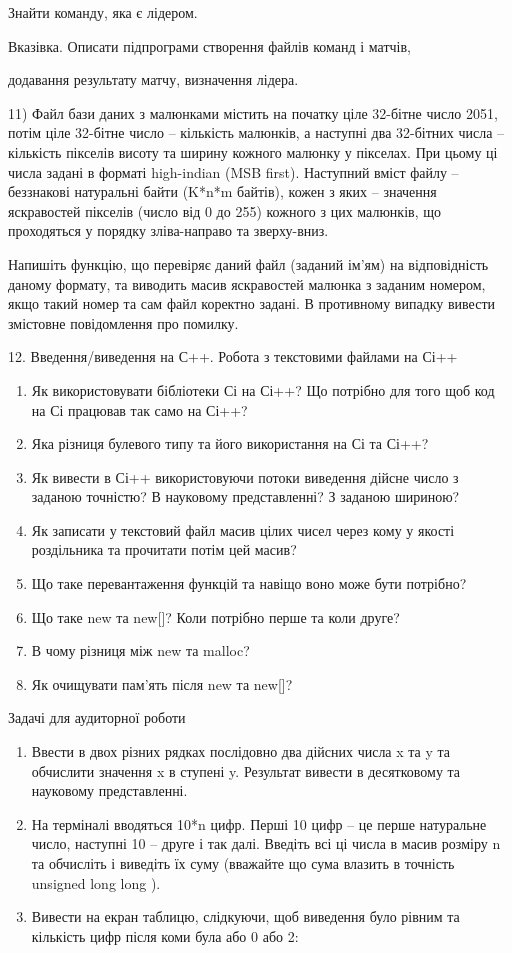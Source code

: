\documentclass[]{article}
\begin{document}
Знайти команду, яка є лідером.

Вказівка. Описати підпрограми створення файлів команд і матчів,

додавання результату матчу, визначення лідера.

11) Файл бази даних з малюнками містить на початку ціле 32-бітне число
2051, потім ціле 32-бітне число -- кількість малюнків, а наступні два
32-бітних числа -- кількість пікселів висоту та ширину кожного малюнку у
пікселах. При цьому ці числа задані в форматі high-indian (MSB first).
Наступний вміст файлу -- беззнакові натуральні байти (K*n*m байтів),
кожен з яких -- значення яскравостей пікселів (число від 0 до 255)
кожного з цих малюнків, що проходяться у порядку зліва-направо та
зверху-вниз.

Напишіть функцію, що перевіряє даний файл (заданий ім'ям) на
відповідність даному формату, та виводить масив яскравостей малюнка з
заданим номером, якщо такий номер та сам файл коректно задані. В
противному випадку вивести змістовне повідомлення про помилку.

12. Введення/виведення на С++. Робота з текстовими файлами на Сі++

\begin{enumerate}
\def\labelenumi{\arabic{enumi})}
\item
  Як використовувати бібліотеки Сі на Сі++? Що потрібно для того щоб код
  на Сі працював так само на Сі++?
\item
  Яка різниця булевого типу та його використання на Сі та Сі++?
\item
  Як вивести в Сі++ використовуючи потоки виведення дійсне число з
  заданою точністю? В науковому представленні? З заданою шириною?
\item
  Як записати у текстовий файл масив цілих чисел через кому у якості
  роздільника та прочитати потім цей масив?
\item
  Що таке перевантаження функцій та навіщо воно може бути потрібно?
\item
  Що таке new та new{[}{]}? Коли потрібно перше та коли друге?
\item
  В чому різниця між new та malloc?
\item
  Як очищувати пам'ять після new та new{[}{]}?
\end{enumerate}

Задачі для аудиторної роботи

\begin{enumerate}
\def\labelenumi{\arabic{enumi})}
\item
  Ввести в двох різних рядках послідовно два дійсних числа x та y та
  обчислити значення x в ступені y. Результат вивести в десятковому та
  науковому представленні.
\item
  На терміналі вводяться 10*n цифр. Перші 10 цифр -- це перше натуральне
  число, наступні 10 -- друге і так далі. Введіть всі ці числа в масив
  розміру n та обчисліть і виведіть їх суму (вважайте що сума влазить в
  точність unsigned long long ).
\item
  Вивести на екран таблицю, слідкуючи, щоб виведення було рівним та
  кількість цифр після коми була або 0 або 2:
\end{enumerate}
\end{document}
